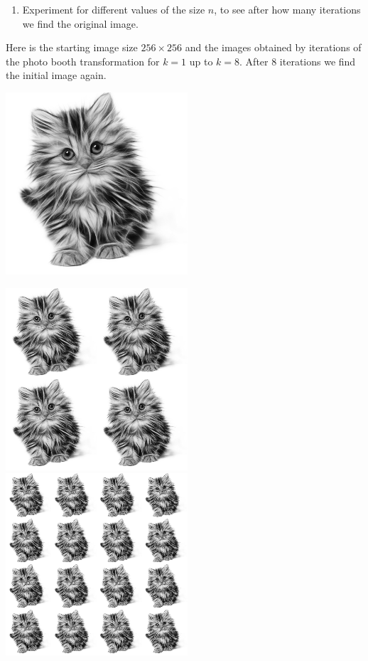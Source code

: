 \documentclass[11pt,class=report,crop=false]{standalone}
\begin{document}
\begin{activite}
\begin{enumerate}
  \item Experiment for different values of the size $n$, to see after how many iterations we find the original image.
  
\end{enumerate}

Here is the starting image size $256 \times 256$ and the images obtained by iterations of the photo booth transformation for $k=1$ up to $k=8$. After $8$ iterations we find the initial image again.
\begin{center}
\includegraphics[scale=\myscale,scale=0.4]{images_chapter/cat_gimp_new_photo_0.png}
\end{center}
\begin{center}
\includegraphics[scale=\myscale,scale=0.3]{images_chapter/cat_gimp_new_photo_1.png}\qquad
\includegraphics[scale=\myscale,scale=0.3]{images_chapter/cat_gimp_new_photo_2.png}\qquad

\end{center}
\end{activite}
\end{document}
